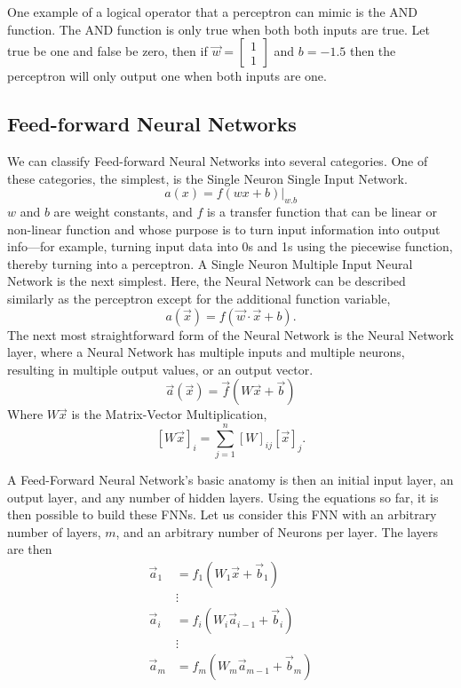 One example of a logical operator that a perceptron can mimic is the AND function. The AND function is only true when both both inputs are true. Let true be one and false be zero, then if $\vec{w}=\begin{bmatrix}1 \\ 1\end{bmatrix}$ and $b=-1.5$ then the perceptron will only output one when both inputs are one.

\subsection{Feed-forward Neural Networks}

We can classify Feed-forward Neural Networks into several categories. One of these categories, the simplest, is the Single Neuron Single Input Network. 
$$a(x)=f(wx + b)|_{w.b}$$
$w$ and $b$ are weight constants, and $f$ is a transfer function that can be linear or non-linear function and whose purpose is to turn input information into output info—for example, turning input data into 0s and 1s using the piecewise function, thereby turning into a perceptron. A Single Neuron Multiple Input Neural Network is the next simplest. Here, the Neural Network can be described similarly as the perceptron except for the additional function variable, $$a(\vec{x})=f(\vec{w}\cdot \vec{x}+b).$$ The next most straightforward form of the Neural Network is the Neural Network layer, where a Neural Network has multiple inputs and multiple neurons, resulting in multiple output values, or an output vector. 
$$\vec{a}(\vec{x})=\vec{f}(W\vec{x}+\vec{b})$$ Where $W\vec{x}$ is the Matrix-Vector Multiplication, $$[W\vec{x}]_i=\sum_{j=1}^n [W]_{ij}[\vec{x}]_{j}.$$ 

A Feed-Forward Neural Network's basic anatomy is then an initial input layer, an output layer, and any number of hidden layers. Using the equations so far, it is then possible to build these FNNs. Let us consider this FNN with an arbitrary number of layers, $m$, and an arbitrary number of Neurons per layer. The layers are then 
\begin{align*}
\vec{a}_1 &= f_1(W_1\vec{x} +\vec{b}_1 )\\
&\vdots\\
\vec{a}_i &= f_i(W_i\vec{a}_{i-1}+\vec{b}_i)\\
&\vdots\\
\vec{a}_m &= f_m(W_m\vec{a}_{m-1}+\vec{b}_m)\\
\end{align*}

